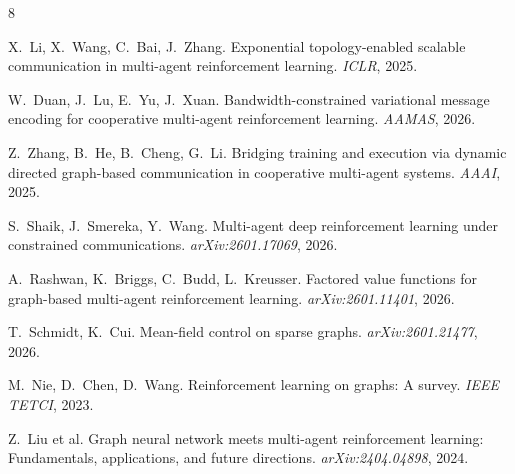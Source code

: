 \documentclass{article}
\begin{document}

\begin{thebibliography}{8}

X.~Li, X.~Wang, C.~Bai, J.~Zhang.
Exponential topology-enabled scalable communication in multi-agent reinforcement learning.
\textit{ICLR}, 2025.

W.~Duan, J.~Lu, E.~Yu, J.~Xuan.
Bandwidth-constrained variational message encoding for cooperative multi-agent reinforcement learning.
\textit{AAMAS}, 2026.

Z.~Zhang, B.~He, B.~Cheng, G.~Li.
Bridging training and execution via dynamic directed graph-based communication in cooperative multi-agent systems.
\textit{AAAI}, 2025.

S.~Shaik, J.~Smereka, Y.~Wang.
Multi-agent deep reinforcement learning under constrained communications.
\textit{arXiv:2601.17069}, 2026.

A.~Rashwan, K.~Briggs, C.~Budd, L.~Kreusser.
Factored value functions for graph-based multi-agent reinforcement learning.
\textit{arXiv:2601.11401}, 2026.

T.~Schmidt, K.~Cui.
Mean-field control on sparse graphs.
\textit{arXiv:2601.21477}, 2026.

M.~Nie, D.~Chen, D.~Wang.
Reinforcement learning on graphs: A survey.
\textit{IEEE TETCI}, 2023.

Z.~Liu et al.
Graph neural network meets multi-agent reinforcement learning: Fundamentals, applications, and future directions.
\textit{arXiv:2404.04898}, 2024.

\end{thebibliography}
\end{document}
